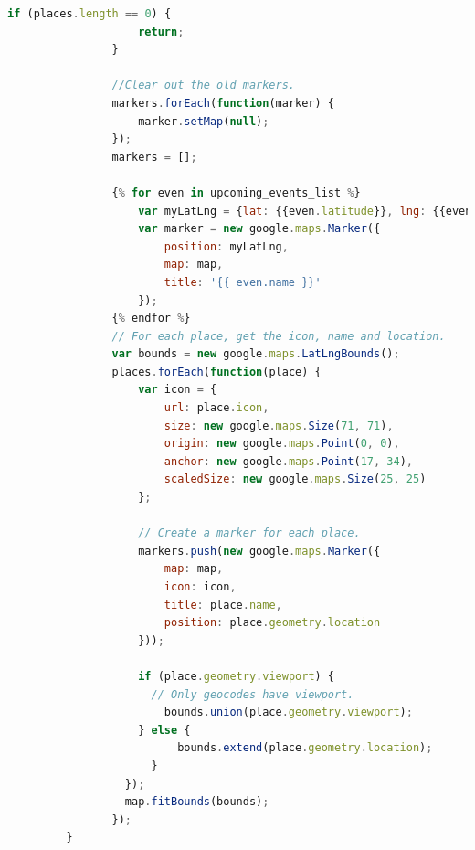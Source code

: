 \documentclass[letterpaper,10pt,onecolumn]{IEEEtran} %
\begin{document}
\begin{enumerate}
\begin{center}
\begin{lstlisting}[language=JavaScript]
                if (places.length == 0) {
                    return;
                }
                
                //Clear out the old markers.
                markers.forEach(function(marker) {
                    marker.setMap(null);
                });
                markers = [];

                {% for even in upcoming_events_list %}
                    var myLatLng = {lat: {{even.latitude}}, lng: {{even.longitude}}};
                    var marker = new google.maps.Marker({
                        position: myLatLng,
                        map: map,
                        title: '{{ even.name }}'
                    });
                {% endfor %}
                // For each place, get the icon, name and location.
                var bounds = new google.maps.LatLngBounds();
                places.forEach(function(place) {
                    var icon = {
                        url: place.icon,
                        size: new google.maps.Size(71, 71),
                        origin: new google.maps.Point(0, 0),
                        anchor: new google.maps.Point(17, 34),
                        scaledSize: new google.maps.Size(25, 25)
                    };

                    // Create a marker for each place.
                    markers.push(new google.maps.Marker({
                        map: map,
                        icon: icon,
                        title: place.name,
                        position: place.geometry.location
                    }));
                    
                    if (place.geometry.viewport) {
                      // Only geocodes have viewport.
                        bounds.union(place.geometry.viewport);
                    } else {
                          bounds.extend(place.geometry.location);
                      }
                  });
                  map.fitBounds(bounds);
                });
         }
      \end{lstlisting}
    \end{center}
  \end{enumerate}
\end{document}
